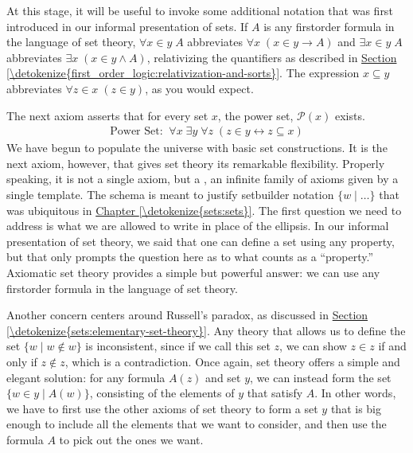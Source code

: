 \documentclass[letterpaper,10pt,english]{sphinxmanual}
\begin{document}
\sphinxAtStartPar
At this stage, it will be useful to invoke some additional notation that was first introduced in our informal presentation of sets. If \(A\) is any first\sphinxhyphen{}order formula in the language of set theory, \(\forall x \in y \; A\) abbreviates \(\forall x \; (x \in y \rightarrow A)\) and \(\exists x \in y \; A\) abbreviates \(\exists x \; (x \in y \wedge A)\), relativizing the quantifiers as described in \hyperref[\detokenize{first_order_logic:relativization-and-sorts}]{Section \ref{\detokenize{first_order_logic:relativization-and-sorts}}}. The expression \(x \subseteq y\) abbreviates \(\forall z \in x \; (z \in y)\), as you would expect.

\sphinxAtStartPar
The next axiom asserts that for every set \(x\), the power set, \(\mathcal{P}(x)\) exists.
\begin{equation*}
\begin{split}\text{Power Set:} \;\; \forall x \; \exists y \; \forall z \; (z \in y \leftrightarrow z \subseteq x)\end{split}
\end{equation*}
\sphinxAtStartPar
We have begun to populate the universe with basic set constructions. It is the next axiom, however, that gives set theory its remarkable flexibility. Properly speaking, it is not a single axiom, but a , an infinite family of axioms given by a single template. The schema is meant to justify set\sphinxhyphen{}builder notation \(\{ w \mid \ldots \}\) that was ubiquitous in \hyperref[\detokenize{sets:sets}]{Chapter \ref{\detokenize{sets:sets}}}. The first question we need to address is what we are allowed to write in place of the ellipsis. In our informal presentation of set theory, we said that one can define a set using any property, but that only prompts the question here as to what counts as a “property.” Axiomatic set theory provides a simple but powerful answer: we can use any first\sphinxhyphen{}order formula in the language of set theory.

\sphinxAtStartPar
Another concern centers around Russell’s paradox, as discussed in \hyperref[\detokenize{sets:elementary-set-theory}]{Section \ref{\detokenize{sets:elementary-set-theory}}}. Any theory that allows us to define the set \(\{ w \mid w \notin w \}\) is inconsistent, since if we call this set \(z\), we can show \(z \in z\) if and only if \(z \notin z\), which is a contradiction. Once again, set theory offers a simple and elegant solution: for any formula \(A(z)\) and set \(y\), we can instead form the set \(\{ w \in y \mid A(w) \}\), consisting of the elements of \(y\) that satisfy \(A\). In other words, we have to first use the other axioms of set theory to form a set \(y\) that is big enough to include all the elements that we want to consider, and then use the formula \(A\) to pick out the ones we want.
\end{document}
